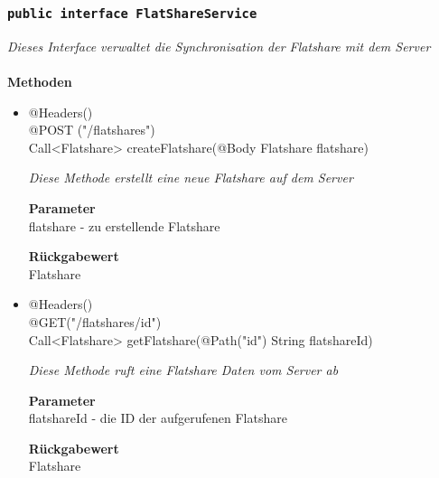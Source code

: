 	\subsubsection{\texttt{public interface  FlatShareService }}
\textit{Dieses Interface verwaltet die Synchronisation der Flatshare mit dem Server}\\
\\
	\textbf{Methoden} \\
		\begin{itemize}
		\item{@Headers()\\ @POST ("/flatshares") \\
Call<Flatshare> createFlatshare(@Body Flatshare flatshare)
}

		\textit{Diese Methode erstellt eine neue Flatshare auf dem Server
}

		\textbf{Parameter} \\
	flatshare - zu erstellende Flatshare 

		\textbf{Rückgabewert} \\
	Flatshare

      \item{@Headers()\\  @GET("/flatshares/{id}")\\ Call<Flatshare> getFlatshare(@Path("id") 					String flatshareId)}

		\textit{Diese Methode ruft eine Flatshare Daten vom Server ab }

		\textbf{Parameter} \\
		flatshareId - die ID der aufgerufenen Flatshare 

		\textbf{Rückgabewert} \\
	Flatshare


	 \end{itemize}



